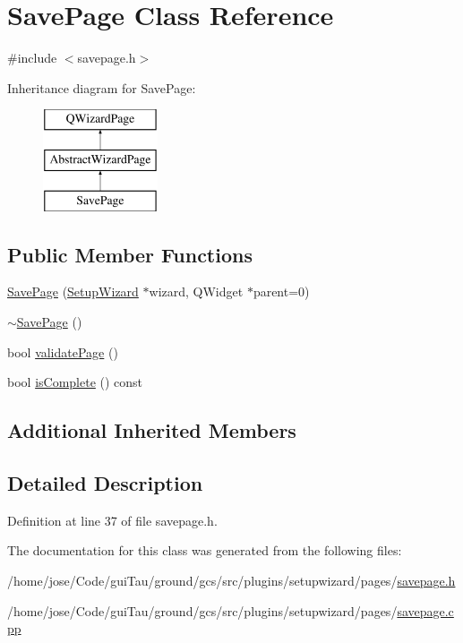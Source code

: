 \hypertarget{class_save_page}{\section{Save\-Page Class Reference}
\label{class_save_page}
}


{\ttfamily \#include $<$savepage.\-h$>$}

Inheritance diagram for Save\-Page\-:\begin{figure}[H]
\begin{center}
\leavevmode
\includegraphics[height=3.000000cm]{class_save_page}
\end{center}
\end{figure}
\subsection*{Public Member Functions}
\begin{DoxyCompactItemize}
\item 
\hyperlink{group___save_page_gaae1ea2c64ea05a862cb17de8c9bfc49b}{Save\-Page} (\hyperlink{class_setup_wizard}{Setup\-Wizard} $\ast$wizard, Q\-Widget $\ast$parent=0)
\item 
\hyperlink{group___save_page_ga7065bd4228b7cdd30c014d43e02dc527}{$\sim$\-Save\-Page} ()
\item 
bool \hyperlink{group___save_page_gad4c1a470c72a8807dff85b13ea2faf7f}{validate\-Page} ()
\item 
bool \hyperlink{group___save_page_gaa7deb093bcc11a89af590b7b4e32b01c}{is\-Complete} () const 
\end{DoxyCompactItemize}
\subsection*{Additional Inherited Members}


\subsection{Detailed Description}


Definition at line 37 of file savepage.\-h.



The documentation for this class was generated from the following files\-:\begin{DoxyCompactItemize}
\item 
/home/jose/\-Code/gui\-Tau/ground/gcs/src/plugins/setupwizard/pages/\hyperlink{savepage_8h}{savepage.\-h}\item 
/home/jose/\-Code/gui\-Tau/ground/gcs/src/plugins/setupwizard/pages/\hyperlink{savepage_8cpp}{savepage.\-cpp}\end{DoxyCompactItemize}
